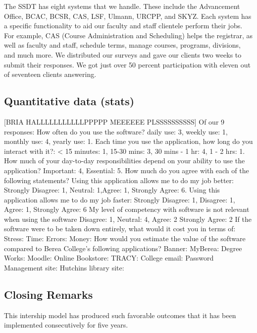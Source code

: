 The SSDT has eight systems that we handle. These include the Advancement Office, BCAC, BCSR, CAS, LSF, Ulmann, URCPP, and SKYZ. Each system has a specific functionality to aid our faculty and staff clientele perform their jobs. For example, CAS (Course Administration and Scheduling) helps the registrar, as well as faculty and staff, schedule terms, manage courses, programs, divisions, and much more.
We distributed our surveys and gave our clients two weeks to submit their responses. We got just over 50 percent participation with eleven out of seventeen clients answering.

\subsection{Quantitative data (stats)}

[BRIA HALLLLLLLLLLLPPPPP MEEEEEE PLSSSSSSSSSS]
Of our 9 responses: %
How often do you use the software? daily use: 3, weekly use: 1, monthly use: 4, yearly use: 1.
Each time you use the  application, how long do you interact with it?: < 15 minutes: 1, 15-30 mins: 3, 30 mins - 1 hr: 4, 1 - 2 hrs: 1.
How much of your day-to-day responsibilities depend on your ability to use the  application? Important: 4, Essential: 5.
How much do you agree with each of the following statements?
Using this application allows me to do my job better: Strongly Disagree: 1, Neutral: 1,Agree: 1, Strongly Agree: 6.
Using this application allows me to do my job faster: Strongly Disagree: 1, Disagree: 1, Agree: 1, Strongly Agree: 6
My level of competency with software is not relevant when using the software Disagree: 1, Neutral: 4, Agree: 2 Strongly Agree: 2
If the software were to be taken down entirely, what would it cost you in terms of:
Stress:
Time:
Errors:
Money:
How would you estimate the value of the software compared to Berea College's following applications?
Banner:
MyBerea:
Degree Works:
Moodle:
Online Bookstore:
TRACY:
College email:
Password Management site:
Hutchins library site:

\subsection{Closing Remarks}
This intership model has produced such favorable outcomes that it has been implemented consecutively for five years.
